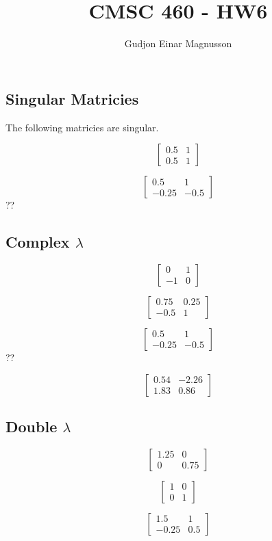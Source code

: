 \documentclass[12pt]{article}
\begin{document}
\title{CMSC 460 - HW6}
\author{Gudjon Einar Magnusson}

\maketitle

\section{}

\subsection{Singular Matricies}

The following matricies are singular. 

\[
\begin{bmatrix}
    0.5 & 1 \\
    0.5 & 1
\end{bmatrix}
\]

\[
\begin{bmatrix}
    0.5 & 1 \\
    -0.25 & -0.5
\end{bmatrix}
\]??

\subsection{Complex $\lambda$}

\[
\begin{bmatrix}
    0 & 1 \\
    -1 & 0
\end{bmatrix}
\]

\[
\begin{bmatrix}
    0.75 & 0.25 \\
    -0.5 & 1
\end{bmatrix}
\]

\[
\begin{bmatrix}
    0.5 & 1 \\
    -0.25 & -0.5
\end{bmatrix}
\]??

\[
\begin{bmatrix}
    0.54 & -2.26 \\
    1.83 & 0.86
\end{bmatrix}
\]

\subsection{Double $\lambda$}

\[
\begin{bmatrix}
    1.25 & 0 \\
    0 & 0.75
\end{bmatrix}
\]

\[
\begin{bmatrix}
    1 & 0 \\
    0 & 1
\end{bmatrix}
\]

\[
\begin{bmatrix}
    1.5 & 1 \\
    -0.25 & 0.5
\end{bmatrix}
\]
\end{document}
